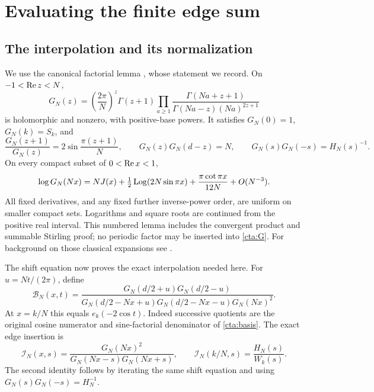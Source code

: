 \section{Evaluating the finite edge sum}\label{cta:edge}

\subsection{The interpolation and its normalization}
We use the canonical factorial lemma
\cite[Lemma~2.1]{ConwayAnalysis}, whose statement we record.
On \(-1<\operatorname{Re} z<N\),
\begin{equation}\label{cta:G}
 G_N(z)=\left(\frac{2\pi}{N}\right)^z\Gamma(z+1)
       \prod_{a\ge1}
       \frac{\Gamma(Na+z+1)}
            {\Gamma(Na-z)(Na)^{2z+1}}
\end{equation}
is holomorphic and nonzero, with positive-base powers.
It satisfies \(G_N(0)=1\), \(G_N(k)=S_k\), and
\[
 \frac{G_N(z+1)}{G_N(z)}=2\sin\frac{\pi(z+1)}N,\qquad
 G_N(z)G_N(d-z)=N,\qquad G_N(s)G_N(-s)=H_N(s)^{-1}.
\]
On every compact subset of \(0<\operatorname{Re} x<1\),
\begin{equation}\label{cta:G-asymptotic}
 \log G_N(Nx)=NJ(x)+\tfrac12\operatorname{Log}(2N\sin\pi x)
             +\frac{\pi\cot\pi x}{12N}+O(N^{-3}).
\end{equation}
All fixed derivatives, and any fixed further inverse-power order,
are uniform on smaller compact sets. Logarithms and square roots
are continued from the positive real interval. This numbered
lemma includes the convergent product and summable Stirling proof;
no periodic factor may be inserted into \eqref{cta:G}.
For background on those classical expansions see \cite[Section~5.11]{DLMF}.

The shift equation now proves the exact interpolation needed here.
For \(u=Nt/(2\pi)\), define
\begin{equation}\label{cta:interpolant}
 \mathcal B_N(x,t)=
 \frac{G_N(d/2+u)G_N(d/2-u)}
 {G_N(d/2-Nx+u)G_N(d/2-Nx-u)G_N(Nx)^2}.
\end{equation}
At \(x=k/N\) this equals \(e_k(-2\cos t)\).
Indeed successive quotients are the original cosine numerator
and sine-factorial denominator of \eqref{cta:basis}.
The exact edge insertion is
\begin{equation}\label{cta:insertion}
 \mathcal I_N(x,s)=
 \frac{G_N(Nx)^2}{G_N(Nx-s)G_N(Nx+s)},\qquad
 \mathcal I_N(k/N,s)=\frac{H_N(s)}{W_k(s)}.
\end{equation}
The second identity follows by iterating the same shift equation
and using \(G_N(s)G_N(-s)=H_N^{-1}\).

